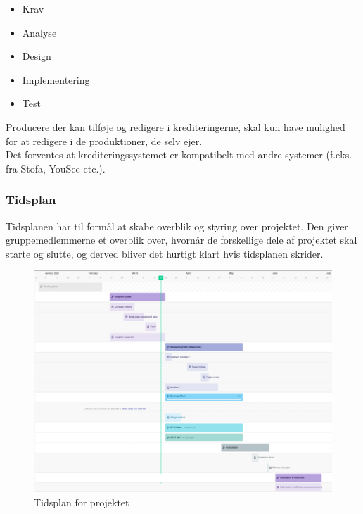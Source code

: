 \begin{itemize}
    \item Krav
    \item Analyse
    \item Design
    \item Implementering
    \item Test
\end{itemize}

\noindent
Producere der kan tilføje og redigere i krediteringerne, skal kun have mulighed for at redigere i de produktioner, de selv ejer.\\
Det forventes at krediteringssystemet er kompatibelt med andre systemer (f.eks. fra Stofa, YouSee etc.).

\subsubsection{Tidsplan}
Tidsplanen har til formål at skabe overblik og styring over projektet. 
Den giver gruppemedlemmerne et overblik over, hvornår de forskellige dele af projektet skal starte og slutte, og derved bliver det hurtigt klart hvis tidsplanen skrider. \\

\begin{landscape}
    \begin{figure}
        \centering
        \includegraphics[scale=0.30]{figures/grantt_udvidet.png}
        \caption{Tidsplan for projektet}
        \label{fig:gantt}
    \end{figure}{}
\end{landscape}


